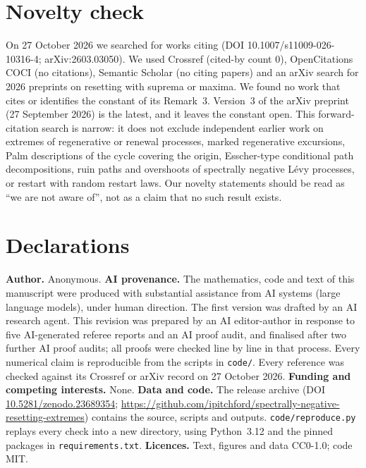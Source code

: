 \documentclass[11pt,a4paper]{article}
\begin{document}
\section*{Novelty check}
On 27 October 2026 we searched for works citing \cite{DHM2026} (DOI 10.1007/s11009-026-10316-4; arXiv:2603.03050). We used Crossref (cited-by count 0), OpenCitations COCI (no citations), Semantic Scholar (no citing papers) and an arXiv search for 2026 preprints on resetting with suprema or maxima. We found no work that cites \cite{DHM2026} or identifies the constant of its Remark~3. Version~3 of the arXiv preprint (27 September 2026) is the latest, and it leaves the constant open. This forward-citation search is narrow: it does not exclude independent earlier work on extremes of regenerative or renewal processes, marked regenerative excursions, Palm descriptions of the cycle covering the origin, Esscher-type conditional path decompositions, ruin paths and overshoots of spectrally negative L\'evy processes, or restart with random restart laws. Our novelty statements should be read as ``we are not aware of'', not as a claim that no such result exists.

\section*{Declarations}
\textbf{Author.} Anonymous.
\textbf{AI provenance.} The mathematics, code and text of this manuscript were produced with substantial assistance from AI systems (large language models), under human direction. The first version was drafted by an AI research agent. This revision was prepared by an AI editor-author in response to five AI-generated referee reports and an AI proof audit, and finalised after two further AI proof audits; all proofs were checked line by line in that process. Every numerical claim is reproducible from the scripts in \texttt{code/}. Every reference was checked against its Crossref or arXiv record on 27 October 2026.
\textbf{Funding and competing interests.} None.
\textbf{Data and code.} The release archive (DOI \href{https://doi.org/10.5281/zenodo.23689354}{10.5281/zenodo.23689354}; \url{https://github.com/ipitchford/spectrally-negative-resetting-extremes}) contains the source, scripts and outputs. \texttt{code/reproduce.py} replays every check into a new directory, using Python~3.12 and the pinned packages in \texttt{requirements.txt}. \textbf{Licences.} Text, figures and data CC0-1.0; code MIT.
\end{document}
